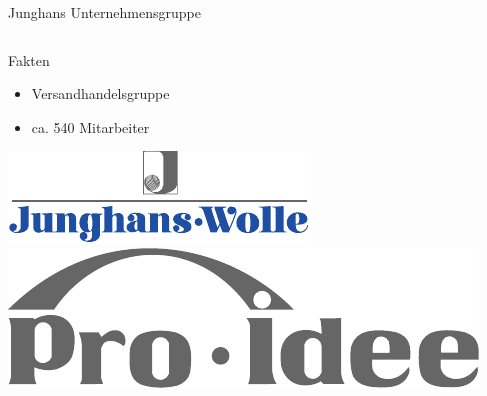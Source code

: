 \begin{frame}{Junghans Unternehmensgruppe}
\begin{columns}
		\begin{column}{.55\textwidth}
			\begin{block}{Fakten}
				\begin{itemize}
						\item Versandhandelsgruppe
						\item ca. 540 Mitarbeiter
				\end{itemize}
			\end{block}
			\vspace*{2ex}
			\begin{block}{}
				\hspace*{.37\textwidth}
				\includegraphics[width=.63\textwidth]{images/J_60_Schwarz_Reflex_Blue}
				\\
				\includegraphics[width=.63\textwidth]{images/ProIdeeLogo}
			\end{block}
		\end{column}
	\end{columns}
\end{frame}

